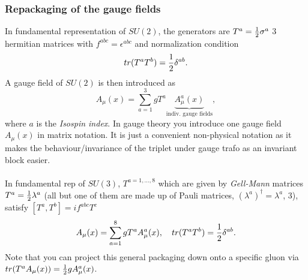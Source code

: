 \subsubsection{Repackaging of the gauge fields}
In fundamental representation of $SU(2)$, the generators are $T^a=\frac{1}{2} \sigma^a$ $3$ hermitian matrices with $f^{abc} = \epsilon^{abc}$ and normalization condition
\begin{equation}
	tr(T^a T^b) =\frac{1}{2} \delta^{ab}.
\end{equation}
A gauge field of $SU(2)$ is then introduced as
\begin{equation}
	A_\mu(x) = \sum_{a=1}^{3} g T^a \underbrace{A^a_\mu(x)}_{\text{indiv. gauge fields}},
\end{equation}
where $a$ is the \emph{Isospin index}. In gauge theory you introduce one gauge field $A_\mu(x)$ in matrix notation. It is just a convenient non-physical notation as it makes the behaviour/invariance of the triplet under gauge trafo as an invariant block easier.\\
\\
In fundamental rep of $SU(3)$, $T^{a=1,\dots,8}$ which are given by \emph{Gell-Mann} matrices $T^a =\frac{1}{2} \lambda^a$ (all but one of them are made up of Pauli matrices, $(\lambda^a)^\dagger=\lambda^a$, 3), satisfy $[T^a,T^b] = i f^{abc} T^c$
\begin{equation*}
	A_\mu(x) =\sum_{a=1}^{8} g T^a A^a_\mu(x),\quad tr(T^a T^b) = \frac{1}{2} \delta^{ab}.
\end{equation*}
Note that you can project this general packaging down onto a specific gluon via $tr(T^a A_\mu(x)) = \frac{1}{2} g A^a_\mu(x)$.

